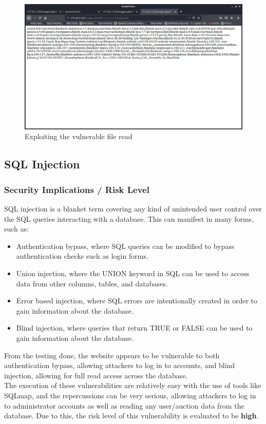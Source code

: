 \documentclass{report}
\begin{document}
\begin{figure}[!htb]
	\centering
	\includegraphics[scale=0.4]{img/pathtraversal3.png}
	\caption{Exploiting the vulnerable file read}
\end{figure}
\pagebreak



\subsection{SQL Injection}
\subsubsection{Security Implications / Risk Level}
SQL injection is a blanket term covering any kind of unintended user control over the SQL queries interacting with a database. This can manifest in many forms, such as:
\begin{itemize}
	\item Authentication bypass, where SQL queries can be modified to bypass authentication checks such as login forms.
	\item Union injection, where the UNION keyword in SQL can be used to access data from other columns, tables, and databases.
	\item Error based injection, where SQL errors are intentionally created in order to gain information about the database.
	\item Blind injection, where queries that return TRUE or FALSE can be used to gain information about the database.
\end{itemize}
From the testing done, the website appears to be vulnerable to both authentication bypass, allowing attackers to log in to accounts, and blind injection, allowing for full read access across the database.\\
The execution of these vulnerabilities are relatively easy with the use of tools like SQLmap, and the repercussions can be very serious, allowing attackers to log in to administrator accounts as well as reading any user/auction data from the database. Due to this, the risk level of this vulnerability is evaluated to be \textbf{high}.
\end{document}
